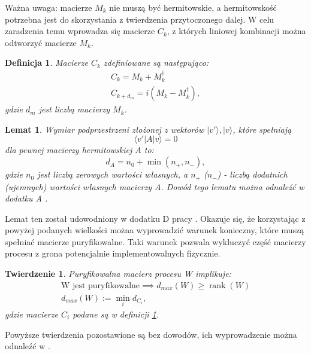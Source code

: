 \documentclass[10pt]{article} %
\newtheorem{definicja}{Definicja}
\newtheorem{tw}{Twierdzenie}
\newtheorem{lm}{Lemat}
\DeclareMathOperator{\Rank}{rank}
\newcommand{\Ket}[1]{|#1\rangle}
\newcommand{\Bra}[1]{\langle#1|}
\newcommand{\LPV}{{L^\perp_V}}
\begin{document}
Ważna uwaga: macierze $M_k$ nie muszą być hermitowskie, a hermitowskość potrzebna jest do skorzystania z twierdzenia przytoczonego dalej. W celu zaradzenia temu wprowadza się macierze $C_k$, z których liniowej kombinacji można odtworzyć macierze $M_k$.
\begin{definicja}
\label{ck}
Macierze $C_k$ zdefiniowane są następująco:
\begin{equation}
\begin{gathered}
C_k = M_k + M_k^\dag \\
C_{k+d_m} = i(M_k - M_k^\dag),
\end{gathered}
\end{equation}
gdzie $d_m$ jest liczbą macierzy $M_k$.
\end{definicja}
\begin{lm}
Wymiar podprzestrzeni złożonej z wektorów $\Ket{v'}, \Ket{v}$, które spełniają
\begin{equation}
\Bra{v'}A\Ket{v} = 0
\end{equation} dla pewnej macierzy hermitowskiej $A$ to:
\begin{equation}
d_{A} = n_{0} + \min(n_{+}, n_{-}),
\end{equation}
gdzie $n_{0}$ jest liczbą zerowych wartości własnych, a $n_{+}$ ($n_{-}$) - liczbą dodatnich (ujemnych) wartości własnych macierzy $A$. Dowód tego lematu można odnaleźć w dodatku A \cite{purification}.
\end{lm}
Lemat ten został udowodniony w dodatku D pracy \cite{purification}.
Okazuje się, że korzystając z powyżej podanych wielkości można wyprowadzić warunek konieczny, które muszą spełniać macierze puryfikowalne. Taki warunek pozwala wykluczyć część macierzy procesu z grona potencjalnie implementowalnych fizycznie.
\begin{tw}
Puryfikowalna macierz procesu W implikuje:
\begin{gather}
\text{W jest puryfikowalne} \implies d_{max}(W) \geq \Rank(W) \\
d_{max}(W) := \min_i d_{C_i} ,
\end{gather}
gdzie macierze $C_i$ podane są w definicji \ref{ck}.
\end{tw}
Powyższe twierdzenia pozostawione są bez dowodów, ich wyprowadzenie można odnaleźć w \cite{purification}.
\end{document}
